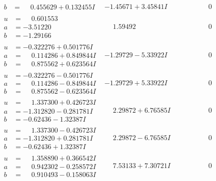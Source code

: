 \documentclass[1p]{elsarticle_modified}
\theoremstyle{definition}
\begin{document}
$$\begin{array}{c|c|c}
\begin{aligned}
b &= \phantom{-}0.455629 + 0.132455 I\end{aligned}
 & -1.45671 + 3.45841 I & \phantom{-0.000000 } 0 \\ \hline\begin{aligned}
u &= \phantom{-}0.601553\phantom{ +0.000000I} \\
a &= -3.51220\phantom{ +0.000000I} \\
b &= -1.29166\phantom{ +0.000000I}\end{aligned}
 & \phantom{-}1.59492\phantom{ +0.000000I} & \phantom{-0.000000 } 0 \\ \hline\begin{aligned}
u &= -0.322276 + 0.501776 I \\
a &= \phantom{-}0.114286 + 0.849844 I \\
b &= \phantom{-}0.875562 + 0.623564 I\end{aligned}
 & -1.29729 - 5.33922 I & \phantom{-0.000000 } 0 \\ \hline\begin{aligned}
u &= -0.322276 - 0.501776 I \\
a &= \phantom{-}0.114286 - 0.849844 I \\
b &= \phantom{-}0.875562 - 0.623564 I\end{aligned}
 & -1.29729 + 5.33922 I & \phantom{-0.000000 } 0 \\ \hline\begin{aligned}
u &= \phantom{-}1.337300 + 0.426723 I \\
a &= -1.312820 - 0.281781 I \\
b &= -0.62436 - 1.32387 I\end{aligned}
 & \phantom{-}2.29872 + 6.76585 I & \phantom{-0.000000 } 0 \\ \hline\begin{aligned}
u &= \phantom{-}1.337300 - 0.426723 I \\
a &= -1.312820 + 0.281781 I \\
b &= -0.62436 + 1.32387 I\end{aligned}
 & \phantom{-}2.29872 - 6.76585 I & \phantom{-0.000000 } 0 \\ \hline\begin{aligned}
u &= \phantom{-}1.358890 + 0.366542 I \\
a &= \phantom{-}0.942302 - 0.258572 I \\
b &= \phantom{-}0.910493 - 0.158063 I\end{aligned}
 & \phantom{-}7.53133 + 7.30721 I & \phantom{-0.000000 } 0 \\ \hline\begin{aligned}

\end{aligned}
\end{array}$$
\end{document}
